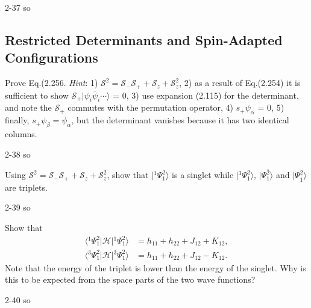 \documentclass[a4paper]{book}
\begin{document}
	\begin{solution}
		2-37 so
	\end{solution}
	
	\subsection{Restricted Determinants and Spin-Adapted Configurations}
	
	\begin{exercise}
	Prove Eq.(2.256. {\it Hint}: 1) $\mathscr{S}^2 = \mathscr{S}_- \mathscr{S}_+ + \mathscr{S}_z + \mathscr{S}^2_z$,  2) as a result of Eq.(2.254) it is sufficient to show $\mathscr{S}_+ | \psi_i \bar{\psi}_i \cdots \rangle$ = 0, 3) use expansion (2.115) for the determinant, and note the $\mathscr{S}_+$ commutes with the permutation operator, 4) $s_+ \psi_\alpha $ = 0, 5) finally, $s_+ \psi_\beta = \psi_\alpha $, but the determinant vanishes because it has two identical columns.
	\end{exercise}
	
	\begin{solution}
		2-38 so
	\end{solution}
	
	\begin{exercise}
	Using $\mathscr{S}^2 = \mathscr{S}_- \mathscr{S}_+ + \mathscr{S}_z + \mathscr{S}^2_z$, show that $|{}^1 \Psi^2_1 \rangle$ is a singlet while $|{}^3 \Psi^2_1 \rangle$, $| \Psi^{\bar 2}_1 \rangle$ and $| \Psi^2_{\bar{1}} \rangle$ are triplets.
	\end{exercise}
	
	\begin{solution}
		2-39 so
	\end{solution}
	
	\begin{exercise}
	Show that
	\begin{align*}
		\langle {}^1 \Psi^2_1 | \mathscr{H} | {}^1 \Psi^2_1 \rangle &= h_{11} + h_{22} + J_{12} + K_{12} , \\
		\langle {}^3 \Psi^2_1 | \mathscr{H} | {}^3 \Psi^2_1 \rangle &= h_{11} + h_{22} + J_{12} - K_{12} .
	\end{align*}
	Note that the energy of the triplet is lower than the energy of the singlet. Why is this to be expected from the space parts of the two wave functions?
	\end{exercise}
	
	\begin{solution}
		2-40 so
	\end{solution}
	
\end{document}
